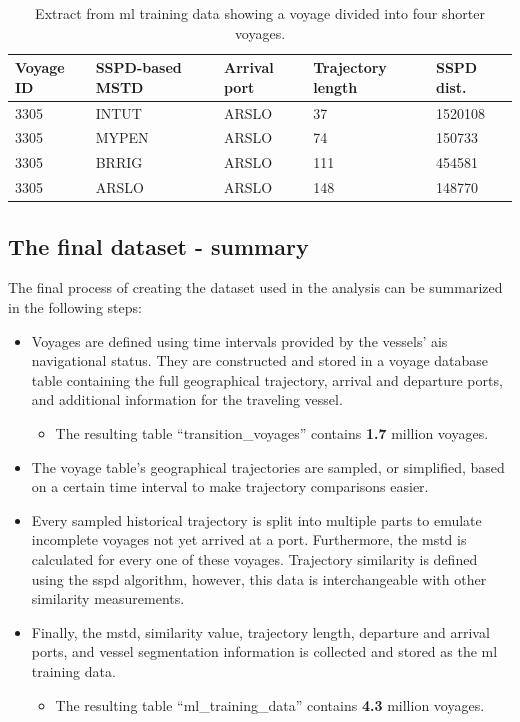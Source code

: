 \begin{table}[htbp]
    \centering
    \small{\begin{tabularx}{0.9\textwidth}{X X X X X}
        \bfseries{Voyage ID} & \bfseries{SSPD-based MSTD} & \bfseries{Arrival port} & \bfseries{Trajectory length} & \bfseries{SSPD dist.} \\ \toprule
        3305 & INTUT & ARSLO & 37 & 1520108 \\ \midrule
        3305 & MYPEN & ARSLO & 74 & 150733 \\ \midrule
        3305 & BRRIG & ARSLO & 111 & 454581 \\ \midrule
        3305 & ARSLO & ARSLO & 148 & 148770 \\ \bottomrule
    \end{tabularx}}
\caption{Extract from ml training data showing a voyage divided into four shorter voyages.}\label{tab:incomplete_voyage}
\end{table}

\subsection{The final dataset - summary}

The final process of creating the dataset used in the analysis can be summarized in the following steps:

\begin{itemize}
    \item Voyages are defined using time intervals provided by the vessels' \acrshort{ais} navigational status. They are constructed and stored in a voyage database table containing the full geographical trajectory, arrival and departure ports, and additional information for the traveling vessel.
    \begin{itemize}
        \item The resulting table ``transition\_voyages'' contains \textbf{1.7} million voyages.
    \end{itemize}
    \item The voyage table's geographical trajectories are sampled, or simplified, based on a certain time interval to make trajectory comparisons easier.
    \item Every sampled historical trajectory is split into multiple parts to emulate incomplete voyages not yet arrived at a port. Furthermore, the \acrshort{mstd} is calculated for every one of these voyages. Trajectory similarity is defined using the \acrshort{sspd} algorithm, however, this data is interchangeable with other similarity measurements.
    \item Finally, the \acrshort{mstd}, similarity value, trajectory length, departure and arrival ports, and vessel segmentation information is collected and stored as the \acrshort{ml} training data.
    \begin{itemize}
        \item The resulting table ``ml\_training\_data'' contains \textbf{4.3} million voyages.
    \end{itemize}
\end{itemize}


